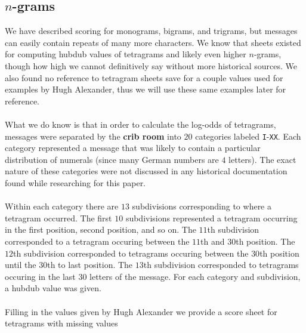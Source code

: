   \subsection{$n$-grams}
  We have described scoring for monograms, bigrams, and trigrams, but
  messages can easily contain repeats of many more characters. We
  know that sheets existed for computing hubdub values of tetragrams
  and likely even higher $n$-grams, though how high we cannot
  definitively say without more historical sources. We also found no
  reference to tetragram sheets save for a couple values used for
  examples by Hugh Alexander, thus we will use these same examples
  later for reference.
  \\\\What we do know is that in order to calculate the log-odds of
  tetragrams, messages were separated by the {\bf{crib room}} into
  $20$ categories labeled \texttt{I}-\texttt{XX}. Each category
  represented a message that was likely to contain a particular
  distribution of numerals (since many German numbers are $4$
  letters). The exact nature of these categories were not discussed
  in any historical documentation found while researching for this paper.
  \\\\Within each category there are $13$ subdivisions corresponding
  to where a tetragram occurred. The first $10$ subdivisions
  represented a tetragram occurring in the first position, second
  position, and so on. The $11$th subdivision corresponded to a
  tetragram occuring between the $11$th and $30$th position. The
  $12$th subdivision corresponded to tetragrams occuring between the
  $30$th position until the $30$th to last position. The $13$th
  subdivision corresponded to tetragrams occuring in the last $30$
  letters of the message. For each category and subdivision, a hubdub
  value was given.
  \\\\Filling in the values given by Hugh Alexander we provide a
  score sheet for tetragrams with missing values
